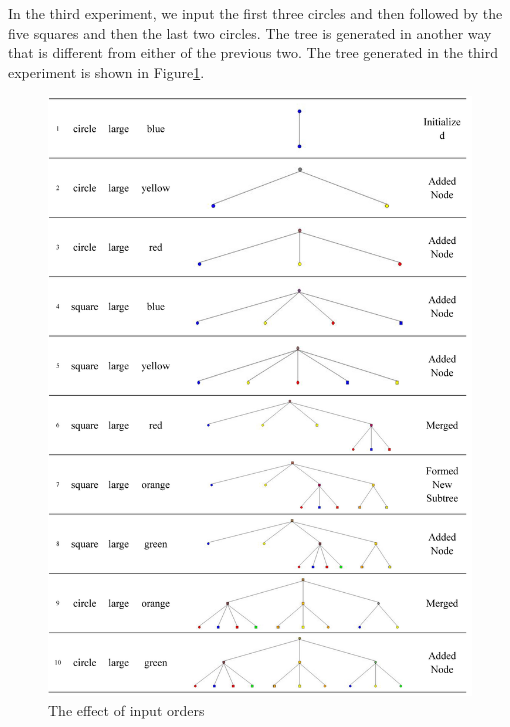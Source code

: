  In the third experiment, we input the first three circles and then followed by the five squares and then the last two circles. The tree is generated in another way that is different from either of the previous two. The tree generated in the third experiment is shown in Figure\ref{Fig:inputseq3}.
 \begin{figure}[h!]
             \centering
             \includegraphics[width=420pt]{../images/inputseq3.jpg}
             \caption{The effect of input orders}
             \label{Fig:inputseq3}
  \end{figure}
 

    
    
    